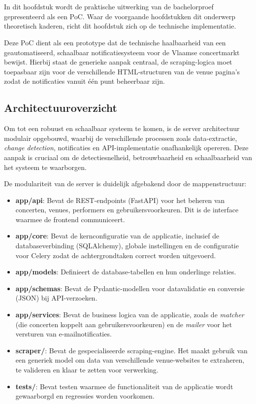 \chapter{}%
\label{ch:proof-of-concept}

In dit hoofdstuk wordt de praktische uitwerking van de bachelorproef gepresenteerd als een \gls{PoC}. 
Waar de voorgaande hoofdstukken dit onderwerp theoretisch kaderen, richt dit hoofdstuk zich op de technische implementatie.

Deze \gls{PoC} dient als een prototype dat de technische haalbaarheid van een geautomatiseerd, schaalbaar notificatiesysteem voor de Vlaamse concertmarkt bewijst.
Hierbij staat de generieke aanpak centraal, de scraping-logica moet toepasbaar zijn voor de verschillende HTML-structuren van de venue pagina's zodat de notificaties vanuit één punt beheerbaar zijn.

\section{Architectuuroverzicht}

Om tot een robuust en schaalbaar systeem te komen, is de server architectuur modulair opgebouwd, waarbij de verschillende processen zoals data-extractie, \textit{change detection}, notificaties en API-implementatie onafhankelijk opereren.
Deze aanpak is cruciaal om de detectiesnelheid, betrouwbaarheid en schaalbaarheid van het systeem te waarborgen.

De modulariteit van de server is duidelijk afgebakend door de mappenstructuur:

\begin{itemize}
    \item \textbf{app/api}: Bevat de REST-endpoints (FastAPI) voor het beheren van concerten, venues, performers en gebruikersvoorkeuren. Dit is de interface waarmee de frontend communiceert.
    \item \textbf{app/core}: Bevat de kernconfiguratie van de applicatie, inclusief de databaseverbinding (SQLAlchemy), globale instellingen en de configuratie voor Celery zodat de achtergrondtaken correct worden uitgevoerd.
    \item \textbf{app/models}: Definieert de database-tabellen en hun onderlinge relaties.
    \item \textbf{app/schemas}: Bevat de Pydantic-modellen voor datavalidatie en conversie (\gls{JSON}) bij API-verzoeken.
    \item \textbf{app/services}: Bevat de business logica van de applicatie, zoals de \textit{matcher} (die concerten koppelt aan gebruikersvoorkeuren) en de \textit{mailer} voor het versturen van e-mailnotificaties.
    \item \textbf{scraper/}: Bevat de gespecialiseerde scraping-engine. Het maakt gebruik van een generiek model om data van verschillende venue-websites te extraheren, te valideren en klaar te zetten voor verwerking.
    \item \textbf{tests/}: Bevat testen waarmee de functionaliteit van de applicatie wordt gewaarborgd en regressies worden voorkomen.
\end{itemize}

